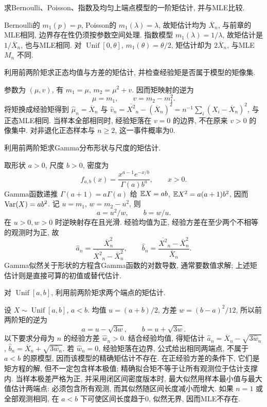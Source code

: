 \begin{example}
求Bernoulli、Poisson、指数及均匀上端点模型的一阶矩估计, 并与MLE比较.
\end{example}
\begin{solution}
Bernoulli的 $m_1(p)=p$, Poisson的 $m_1(\lambda)=\lambda$, 故矩估计均为 $\overline X_n$, 与前章的MLE相同, 边界存在性仍须按参数空间处理. 指数模型 $m_1(\lambda)=1/\lambda$, 故矩估计是 $1/\overline X_n$, 也与MLE相同. 对 $\operatorname{Unif}[0,\theta]$, $m_1(\theta)=\theta/2$, 矩估计却为 $2\overline X_n$, 与MLE $M_n$ 不同.
\end{solution}

\begin{example}
利用前两阶矩求正态均值与方差的矩估计, 并检查经验矩是否属于模型的矩像集.
\end{example}
\begin{solution}
参数为 $(\mu,v)$, 有 $m_1=\mu$, $m_2=\mu^2+v$. 因而矩映射的逆为
\[
 \mu=m_1,\qquad v=m_2-m_1^2.
\]
将矩换成经验矩得到 $\widehat\mu_n=\overline X_n$ 与
$\widehat v_n=\overline{X^2}_n-(\overline X_n)^2=n^{-1}\sum_i(X_i-\overline X_n)^2$, 与正态MLE相同. 当样本全部相同时, 经验矩落在 $v=0$ 的边界, 不在原来 $v>0$ 的像集中. 对非退化正态样本与 $n\ge2$, 这一事件概率为0.
\end{solution}

\begin{example}
利用前两阶矩求Gamma分布形状与尺度的矩估计.
\end{example}
\begin{solution}
取形状 $a>0$, 尺度 $b>0$, 密度为
\[
 f_{a,b}(x)=\frac{x^{a-1}e^{-x/b}}{\Gamma(a)b^a},\qquad x>0.
\]
Gamma函数递推 $\Gamma(a+1)=a\Gamma(a)$ 给 $\mathbb E X=ab$, $\mathbb E X^2=a(a+1)b^2$, 因而 $\operatorname{Var}(X)=ab^2$. 记 $u=m_1$, $w=m_2-u^2$, 则
\[
 a=u^2/w,\qquad b=w/u.
\]
在 $u>0,w>0$ 时逆映射存在且光滑. 经验均值为正, 经验方差在至少两个不相等的观测时为正, 故
\[
 \widehat a_n=\frac{\overline X_n^2}{\overline{X^2}_n-\overline X_n^2},\qquad
 \widehat b_n=\frac{\overline{X^2}_n-\overline X_n^2}{\overline X_n}.
\]
Gamma似然关于形状的方程含Gamma函数的对数导数, 通常要数值求解; 上述矩估计则是直接可算的初值或替代估计.
\end{solution}

\begin{example}
对 $\operatorname{Unif}[a,b]$, 利用前两阶矩求两个端点的矩估计.
\end{example}
\begin{solution}
设 $X\sim\operatorname{Unif}[a,b]$, $a<b$. 均值 $u=(a+b)/2$, 方差 $w=(b-a)^2/12$, 所以前两阶矩的逆为
\[
 a=u-\sqrt{3w},\qquad b=u+\sqrt{3w}.
\]
以下要求分母为 $n$ 的经验方差 $\widehat w_n>0$. 结合经验均值, 得矩估计 $\widehat a_n=\overline X_n-\sqrt{3\widehat w_n}$, $\widehat b_n=\overline X_n+\sqrt{3\widehat w_n}$. 若 $\widehat w_n=0$, 经验矩落在边界, 公式给出相同两端点, 不属于 $a<b$ 的原模型, 因而该模型的精确矩估计不存在. 在正经验方差的条件下, 它们是矩方程的解, 但不一定包含样本极值; 精确拟合矩不等于让所有观测位于估计支撑内. 当样本极差严格为正, 并采用闭区间密度版本时, 最大似然用样本最小值与最大值估计两端点: 必须包含所有观测, 而其似然随区间长度减小而增大. 如果 $n=1$ 或全部观测相同, 在 $a<b$ 下可使区间长度趋于0, 似然无界, 因而MLE不存在.
\end{solution}

